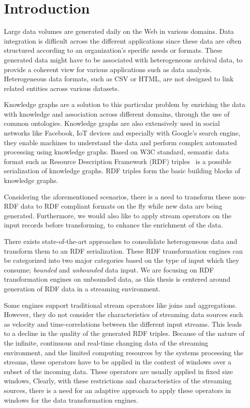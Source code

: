 \chapter{Introduction}
\label{chap:intro}

Large data volumes are generated daily on the Web in various domains.
Data integration is difficult across the different applications since these
data are often structured according to an organization's specific needs or formats. 
These generated data might have to be associated with heterogeneous archival data,  
to provide a coherent view for various applications such as 
data analysis. Heterogeneous data formats, such as CSV or HTML, are not
designed to link related entities across various datasets. 

Knowledge graphs are a solution to
this particular problem by enriching the data with knowledge and association across
different domains, through the use of common ontologies.
Knowledge graphs are also extensively used in social networks like 
Facebook\cite{facebook_linked_data}, IoT devices\cite{graph_of_things} and especially with Google's search
engine\cite{google_kg}, they enable machines to understand the data and perform complex automated processing
using knowledge graphs. 
Based on W3C standard, semantic data format such as Resource Description Framework (RDF)
triples~\cite{intro_rdf} is a possible serialization of knowledge graphs.  
RDF triples form the basic building blocks of knowledge graphs.

Considering the aforementioned scenarios, there is a need to transform these non-RDF data to RDF compliant formats on the fly while
new data are being generated. Furthermore, we would also like to apply stream operators on the input records
before transforming, to enhance the enrichment of the data.

There exists state-of-the-art approaches to consolidate heterogeneous data
and transform them to an RDF serialization. 
These RDF transformation engines can be categorized into two major categories based on the type of input
which they consume; \emph{bounded} and \emph{unbounded} data input. We are focusing on RDF transformation 
engines on unbounded data, as this thesis is centered around generation of RDF data in a streaming environment.  

Some engines support traditional stream operators like joins and aggregations. However, they do not consider
the characteristics of streaming data sources such as velocity and time-correlations between the different
input streams. This leads to a decline in the quality of the generated RDF triples. Because of the nature of the 
infinite, continuous and real-time changing data of the streaming environment, and 
the limited computing resources by the systems processing the streams, 
these operators have to be applied in the context of windows over a subset of the incoming data.
These operators are usually applied in fixed size windows,
Clearly, with these restrictions and characteristics of the streaming sources, there is a need 
for an adaptive approach to apply these operators in windows for the data transformation engines. 

